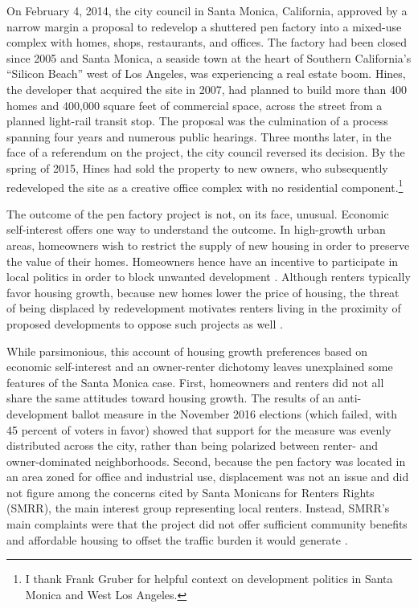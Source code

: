 \documentclass[article,12pt]{memoir}
\begin{document}
On February 4, 2014, the city council in Santa Monica, California, approved by a narrow margin a proposal to redevelop a shuttered pen factory into a mixed-use complex with homes, shops, restaurants, and offices. The factory had been closed since 2005 and Santa Monica, a seaside town at the heart of Southern California's ``Silicon Beach'' west of Los Angeles, was experiencing a real estate boom.  Hines, the developer that acquired the site in 2007, had planned to build more than 400 homes and 400,000 square feet of commercial space, across the street from a planned light-rail transit stop.  The proposal was the culmination of a process spanning four years and numerous public hearings. Three months later, in the face of a referendum on the project, the city council reversed its decision.  By the spring of 2015, Hines had sold the property to new owners, who subsequently redeveloped the site as a creative office complex with no residential component.\footnote{I thank Frank Gruber for helpful context on development politics in Santa Monica and West Los Angeles.}

The outcome of the pen factory project is not, on its face, unusual. Economic self-interest offers one way to understand the outcome. In high-growth urban areas, homeowners wish to restrict the supply of new housing in order to preserve the value of their homes. Homeowners hence have an incentive to participate in local politics in order to block unwanted development \citep{fischel_homevoter_2001,oliver_local_2012,been_urban_2014,mccabe_no_2016}. Although renters typically favor housing growth, because new homes lower the price of housing, the threat of being displaced by redevelopment motivates renters living in the proximity of proposed developments to oppose such projects as well \citep{mollenkopf_contested_1983,hankinson_when_2018}.

While parsimonious, this account of housing growth preferences based on economic self-interest and an owner-renter dichotomy leaves unexplained some features of the Santa Monica case. First, homeowners and renters did not all share the same attitudes toward housing growth. The results of an anti-development ballot measure in the November 2016 elections (which failed, with 45 percent of voters in favor) showed that support for the measure was evenly distributed across the city, rather than being polarized between renter- and owner-dominated neighborhoods. Second, because the pen factory was located in an area zoned for office and industrial use, displacement was not an issue and did not figure among the concerns cited by Santa Monicans for Renters Rights (SMRR), the main interest group representing local renters. Instead, SMRR's main complaints were that the project did not offer sufficient community benefits and affordable housing to offset the traffic burden it would generate \citep{sultan_hines_2014}.
\end{document}
